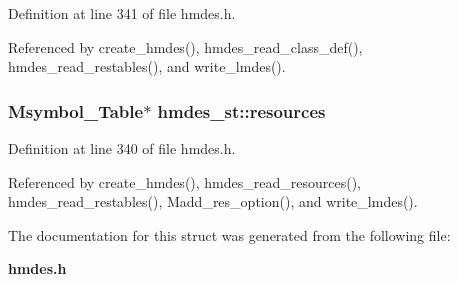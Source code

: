 Definition at line 341 of file hmdes.h.

Referenced by create\_\-hmdes(), hmdes\_\-read\_\-class\_\-def(), hmdes\_\-read\_\-restables(), and write\_\-lmdes().
\subsubsection{\setlength{\rightskip}{0pt plus 5cm}\bf{Msymbol\_\-Table}$\ast$ \bf{hmdes\_\-st::resources}}\label{structhmdes__st_194d8ae8e167cd72a67e1e02cc4ed2bd}




Definition at line 340 of file hmdes.h.

Referenced by create\_\-hmdes(), hmdes\_\-read\_\-resources(), hmdes\_\-read\_\-restables(), Madd\_\-res\_\-option(), and write\_\-lmdes().

The documentation for this struct was generated from the following file:\begin{CompactItemize}
\item 
\bf{hmdes.h}\end{CompactItemize}
